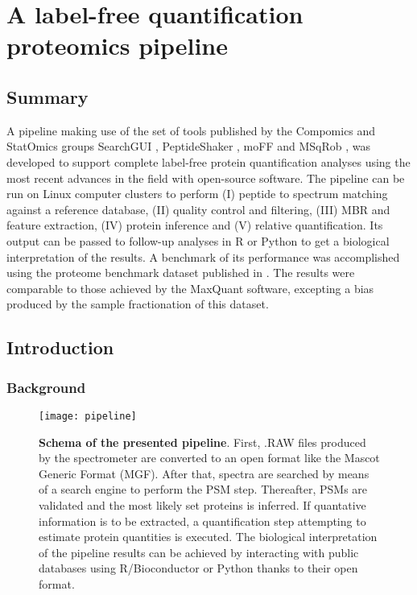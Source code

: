 \chapter{A label-free quantification proteomics pipeline}
\label{chap:pipeline}


\section*{Summary}

A pipeline making use of the set of tools published by the Compomics  and StatOmics groups SearchGUI \cite{Barsnes2018}, PeptideShaker \cite{Vaudel2015}, moFF \cite{Argentini2016} and MSqRob \cite{Goeminne2016} , was developed to support complete label-free protein quantification analyses using the most recent advances in the field with open-source software. The pipeline can be run on Linux computer clusters to perform (I) peptide to spectrum matching against a reference database, (II) quality control and filtering, (III) \ac{MBR} and feature extraction, (IV) protein inference and (V) relative quantification. Its output can be passed to follow-up analyses in R or Python to get a biological interpretation of the results.  A benchmark of its performance was accomplished using the proteome benchmark dataset published in \cite{Cox2014}. The results were comparable to those achieved by the MaxQuant \cite{Cox2014} software, excepting a bias produced by the sample fractionation of this dataset.


\section{Introduction}

\subsection{Background}

\begin{figure}[!h]
\texttt{[image: pipeline]}
\caption[Schema of the presented pipeline]{\textbf{Schema of the presented pipeline}. First, .RAW files produced by the spectrometer are converted to an open format like the Mascot Generic Format (\ac{MGF}). After that, spectra are searched by means of a search engine to perform the PSM step. Thereafter, PSMs are validated and the most likely set proteins is inferred. If quantative information is to be extracted, a quantification step attempting to estimate protein quantities is executed. The biological interpretation of the pipeline results can be achieved by interacting with public databases using R/Bioconductor or Python thanks to their open format.}
\label{fig:pipeline}
\end{figure}



